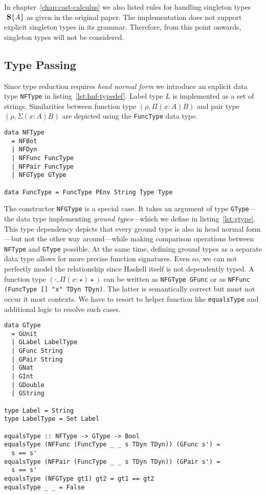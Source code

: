 In chapter~\ref{chap:cast-calculus} we also listed rules for handling singleton types $\text{ \textbf{S}}\{A\}$ as given in the original paper. The implementation does not support explicit singleton types in its grammar. Therefore, from this point onwards, singleton types will not be considered.

\subsection{Type Passing}

Since type reduction requires \emph{head normal form} we introduce an explicit data type \texttt{NFType} in listing~\ref{lst:hnf-typedef}. Label type $L$ is implemented as a set of strings. Similarities between function type $(\rho, \Pi(x:A)B)$ and pair type $(\rho, \Sigma(x:A)B)$ are  depicted using the \texttt{FuncType} data type.

\begin{lstlisting}[float,
  label=lst:hnf-typedef,
  caption=HNF type definition (\texttt{ProcessEnvironment.hs})]
data NFType
  = NFBot
  | NFDyn
  | NFFunc FuncType
  | NFPair FuncType
  | NFGType GType

data FuncType = FuncType PEnv String Type Type
\end{lstlisting}

The constructor \texttt{NFGType} is a special case. It takes an argument of type \texttt{GType}---the data type implementing \emph{ground types}---which we define in listing~\ref{lst:gtype}. This type dependency depicts that every ground type is also in head normal form---but not the other way around---while making comparison operations between \texttt{NFType} and \texttt{GType} possible. At the same time, defining ground types as a separate data type allows for more precise function signatures. Even so, we can not perfectly model the relationship since Haskell itself is not dependently typed. A function type $(\cdot, \Pi(x:\star)\star)$ can be written as \texttt{NFGType GFunc} or as \texttt{NFFunc (FuncType [] "x" TDyn TDyn)}. The latter is semantically correct but must not occur it most contexts. We have to resort to helper function like \texttt{equalsType} and additional logic to resolve such cases.

\begin{lstlisting}[float,
  caption=Ground type definition (\texttt{ProcessEnvironment.hs}),
  label=lst:gtype]
data GType
  = GUnit
  | GLabel LabelType
  | GFunc String
  | GPair String
  | GNat
  | GInt
  | GDouble
  | GString

type Label = String
type LabelType = Set Label

equalsType :: NFType -> GType -> Bool
equalsType (NFFunc (FuncType _ _ s TDyn TDyn)) (GFunc s') =
  s == s'
equalsType (NFPair (FuncType _ _ s TDyn TDyn)) (GPair s') =
  s == s'
equalsType (NFGType gt1) gt2 = gt1 == gt2
equalsType _ _ = False
\end{lstlisting}

